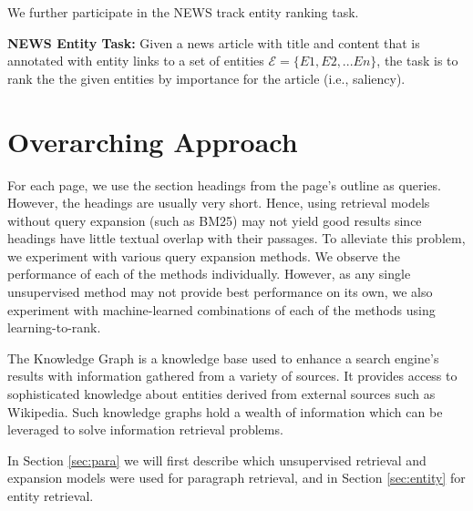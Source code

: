 \documentclass{article}
\begin{document}
\noindent We further participate in the NEWS track entity ranking task. 

\noindent \textbf{NEWS Entity Task:} Given a news article with title and content that is annotated with entity links to a set of entities  $\mathcal{E}=\{E1, E2, ... En\}$, the task is to rank the the given entities by importance for the article (i.e., saliency). 

\medskip 

\section{Overarching Approach}
 For each page, we use the section headings from the page's outline as queries. However, the headings are usually very short. Hence, using retrieval models without query expansion (such as BM25) may not yield good results since headings have little textual overlap with their passages. To alleviate this problem, we experiment with various query expansion methods. We observe the performance of each of the methods individually. However, as any single unsupervised method may not provide best performance on its own, we also experiment with machine-learned combinations of each of the methods using learning-to-rank. 

The Knowledge Graph is a knowledge base used to enhance a search engine's results with information gathered from a variety of sources. It provides access to sophisticated knowledge about entities derived from external sources such as Wikipedia. Such knowledge graphs hold a wealth of information which can be leveraged to solve information retrieval problems. 

In Section \ref{sec:para} we will first describe which unsupervised retrieval and expansion models were used for paragraph retrieval, and in Section \ref{sec:entity} for entity retrieval.  

\end{document}
